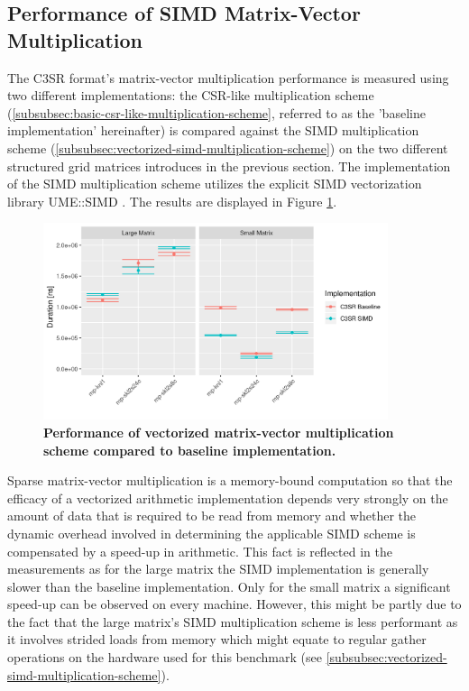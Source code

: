 \documentclass{article}
\begin{document}
  \subsection{Performance of SIMD Matrix-Vector Multiplication}

    The C3SR format's matrix-vector multiplication performance is measured using two different implementations: the CSR-like multiplication scheme (\ref{subsubsec:basic-csr-like-multiplication-scheme}, referred to as the 'baseline implementation' hereinafter) is compared against the SIMD multiplication scheme (\ref{subsubsec:vectorized-simd-multiplication-scheme}) on the two different structured grid matrices introduces in the previous section. The implementation of the SIMD multiplication scheme utilizes the explicit SIMD vectorization library UME::SIMD \cite{umesimd2017}. The results are displayed in Figure \ref{fig:arithmetic-performance}.

    \begin{figure}[!ht]
      \centering
      \includegraphics[width=0.9\textwidth]{assets/arithmetic_performance}
      \caption[Performance of vectorized matrix-vector multiplication scheme compared to baseline implementation.]{\textbf{Performance of vectorized matrix-vector multiplication scheme compared to baseline implementation.}}
      \label{fig:arithmetic-performance}
    \end{figure}

    Sparse matrix-vector multiplication is a memory-bound computation so that the efficacy of a vectorized arithmetic implementation depends very strongly on the amount of data that is required to be read from memory and whether the dynamic overhead involved in determining the applicable SIMD scheme is compensated by a speed-up in arithmetic. This fact is reflected in the measurements as for the large matrix the SIMD implementation is generally slower than the baseline implementation. Only for the small matrix a significant speed-up can be observed on every machine. However, this might be partly due to the fact that the large matrix's SIMD multiplication scheme is less performant as it involves strided loads from memory which might equate to regular gather operations on the hardware used for this benchmark (see \ref{subsubsec:vectorized-simd-multiplication-scheme}).
\end{document}
